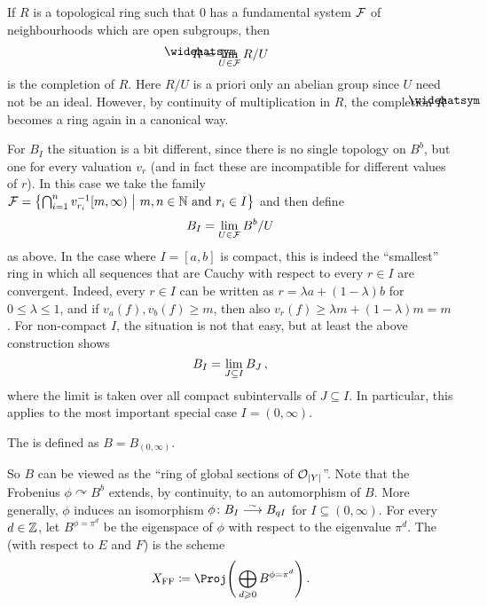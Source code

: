 \begin{rem}
	If $R$ is a topological ring such that $0$ has a fundamental system $\mathcal{F}$ of neighbourhoods which are open subgroups, then
	\begin{equation*}
		\roof{R}=\limit_{U\in\Ff}R/U
	\end{equation*}
	is the completion of $R$. Here $R/U$ is a priori only an abelian group since $U$ need not be an ideal. However, by continuity of multiplication in $R$, the completion $\roof{R}$ becomes a ring again in a canonical way.
	
	For $B_I$ the situation is a bit different, since there is no single topology on $B^b$, but one for every valuation $v_r$ (and in fact these are incompatible for different values of $r$).  In this case we take the family $\mathcal{F}=\left\{\bigcap_{i=1}^nv_{r_i}^{-1}[m,\infty)\ \middle|\  m,n\in\mathbb{N}\text{ and }r_i\in I\right\}$ and then define
	\begin{equation*}
		B_I=\operatorname*{lim}_{U\in \mathcal{F}}B^b/U
	\end{equation*}
	as above. In the case where $I=[a,b]$ is compact, this is indeed the \enquote{smallest} ring in which all sequences that are Cauchy with respect to every $r\in I$ are convergent. Indeed, every $r\in I$ can be written as $r=\lambda a+(1-\lambda)b$ for $0\leq \lambda\leq 1$, and if $v_a(f),v_b(f)\geq m$, then also $v_r(f)\geq \lambda m+(1-\lambda)m=m$. For non-compact $I$, the situation is not that easy, but at least the above construction shows
	\begin{equation*}
		B_I=\operatorname*{lim}_{J\subseteq I}B_J\,,
	\end{equation*}
	where the limit is taken over all compact subintervalls of $J\subseteq I$. In particular, this applies to the most important special case $I=(0,\infty)$.
\end{rem}
\begin{defi}
	The  is defined as $B=B_{(0,\infty)}$.
\end{defi}
So $B$ can be viewed as the \enquote{ring of global sections of $\mathcal{O}_{|Y|}$}. Note that the Frobenius $\phi\curvearrowright B^b$ extends, by continuity, to an automorphism of $B$. More generally, $\phi$ induces an isomorphism $\phi\colon B_I\isomorphism B_{qI}$ for $I\subseteq (0,\infty)$. For every $d\in\mathbb{Z}$, let $B^{\phi=\pi^d}$ be the eigenspace of $\phi$ with respect to the eigenvalue $\pi^d$.
\label{def:FFC}
The  (with respect to $E$ and $F$) is the scheme
\begin{equation*}
	X_\FFC\coloneqq \Proj\Bigg(\bigoplus_{d\geq 0}B^{\phi=\pi^d}\Bigg)\,.
\end{equation*}
